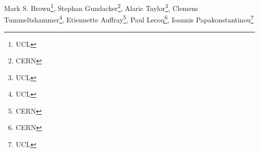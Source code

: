 Mark S. Brown\footnote{UCL}, Stephan Gundacker\footnote{CERN}, Alaric Taylor\footnote{UCL}, Clemens Tummeltshammer\footnote{UCL}, Etiennette Auffray\footnote{CERN}, Paul Lecoq\footnote{CERN}, Ioannis Papakonstantinou\footnote{UCL} 

